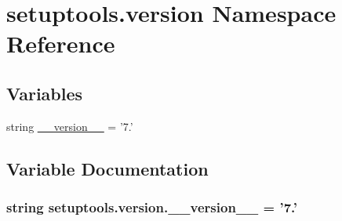 \hypertarget{namespacesetuptools_1_1version}{}\section{setuptools.\+version Namespace Reference}
\label{namespacesetuptools_1_1version}
\subsection*{Variables}
\begin{DoxyCompactItemize}
\item 
string \hyperlink{namespacesetuptools_1_1version_ab4d4833f5d1e743e5f839abe82af05ec}{\+\_\+\+\_\+version\+\_\+\+\_\+} = '7.'
\end{DoxyCompactItemize}


\subsection{Variable Documentation}
\hypertarget{namespacesetuptools_1_1version_ab4d4833f5d1e743e5f839abe82af05ec}{}
\subsubsection[{\+\_\+\+\_\+version\+\_\+\+\_\+}]{\setlength{\rightskip}{0pt plus 5cm}string setuptools.\+version.\+\_\+\+\_\+version\+\_\+\+\_\+ = '7.'}\label{namespacesetuptools_1_1version_ab4d4833f5d1e743e5f839abe82af05ec}
